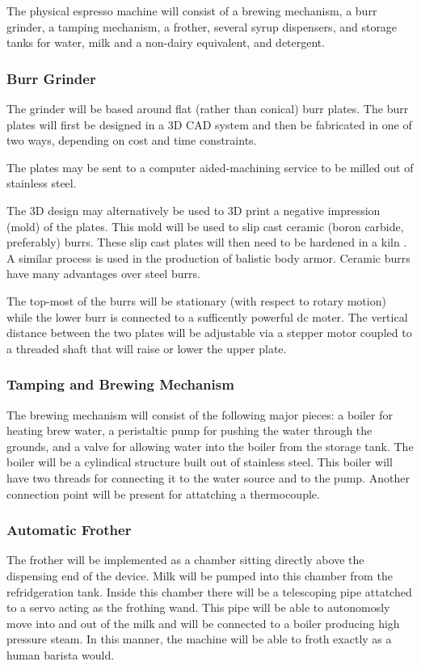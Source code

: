 \documentclass[conference]{IEEEtran}
\begin{document}
The physical espresso machine will consist of a brewing mechanism, a
burr grinder, a tamping mechanism, a frother, several syrup dispensers, and
storage tanks for water, milk and a non-dairy equivalent, and detergent.

\subsubsection{Burr Grinder}
The grinder will be based around flat (rather than conical) burr plates. The
burr plates will first be designed in a 3D CAD system and then be
fabricated in one of two ways, depending on cost and time constraints.

The plates may be sent to a computer aided-machining service to be milled out of
stainless steel. 

The 3D design may alternatively be used to 3D print a negative impression (mold) of the plates.
This mold will be used to slip cast
ceramic (boron carbide, preferably) burrs. These slip cast plates will then need
to be hardened in a kiln \cite{slip}. A similar process is used in the
production of balistic body armor. Ceramic burrs have many advantages over steel burrs.

The top-most of the burrs will be stationary (with respect to rotary motion)
while the lower burr is connected to a sufficently powerful dc moter. The
vertical distance between the two plates will be adjustable via a stepper motor coupled
to a threaded shaft that will raise or lower the upper plate.

\subsubsection{Tamping and Brewing Mechanism}
The brewing mechanism will consist of the following major pieces: a boiler for
heating brew water, a peristaltic pump for pushing the water through the
grounds, and a valve for allowing water into the boiler from the storage tank.
The boiler will be a cylindical structure built out of stainless steel. This
boiler will have two threads for connecting it to the water source and to the
pump. Another connection point will be present for attatching a thermocouple.

\subsubsection{Automatic Frother}
The frother will be implemented as a chamber sitting directly above the
dispensing end of the device. Milk will be pumped into this chamber from the
refridgeration tank. Inside this chamber there will be a telescoping pipe
attatched to a servo acting as the frothing wand. This pipe will be able to
autonomosly move into and out of the milk and will be connected to a boiler
producing high pressure steam. In this manner, the machine will be able to froth
exactly as a human barista would.
\end{document}

